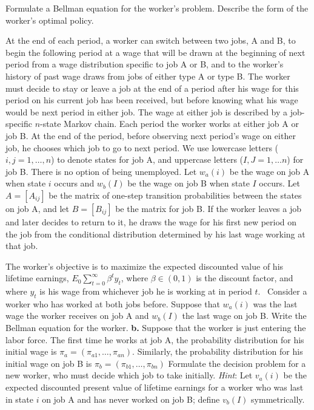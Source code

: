 \medskip
{}  Formulate a Bellman equation for
the worker's problem.
\medskip
{}  Describe the form of the worker's optimal
policy.



\medskip
{} 
\medskip
\noindent
At the end of each period,
 a worker can
switch between two jobs, A and B, to  begin the following
period at a wage that will be drawn at the beginning
of next period from a wage distribution specific to
job A or B, and to the worker's history of past wage
draws from  jobs of either type A or type B.
The worker must decide to stay or leave a job at the end
of a period after his wage for this period on his current
job has been received, but before knowing what his wage
would be next period in either job.  The wage
at either job is described by a job-specific $n$-state
Markov chain.  Each period the worker works at either job
A or job B.  At the end of the period, before observing next
period's wage on either job, he chooses which job to go to
next period.  We use lowercase letters ($i,j = 1 , \ldots, n$)
to denote states for job A, and uppercase letters
($I,J = 1, \ldots n$) for job B.
There is no option of being unemployed.
\medskip
Let $w_a(i)$ be the wage on job A when state $i$ occurs
and $w_b(I)$ be the wage on job B when state $I$ occurs.  Let
$A = \left[A_{ij}\right]$ be the matrix of one-step transition
probabilities between the states on job A, and let
$B = \left[B_{ij}\right]$ be the matrix for job B.  If the worker
leaves a job and later decides to return to it, he draws  the wage for
his first new period on the job from the conditional distribution
determined by his last wage working at that job.

  The worker's objective is to maximize the
expected discounted value of his lifetime earnings,
$E_0 \sum_{t=0}^\infty \beta^t y_t$, where $\beta \in (0,1)$
is the discount factor, and where $y_t$ is his wage from whichever
job he is working at in period $t$.
\medskip
{} \ Consider a worker who has worked
at both jobs before.  Suppose that $w_a(i)$ was the last wage the
worker receives on job A and $w_b(I)$ the last wage on job B.
Write the Bellman equation for the worker.
\medskip
\noindent
{\bf b.}  Suppose that the worker is just entering the labor
force.  The first time he works at job A, the probability distribution
for his initial wage is $\pi_a = (\pi_{a1}, \ldots, \pi_{an})$.
Similarly, the probability distribution for his initial
wage on job B is $\pi_b = (\pi_{b1}, \ldots, \pi_{bn})$  Formulate
the decision problem for a new worker, who must decide which
job to take initially.
{\it Hint}: Let $v_a(i)$ be the expected discounted present value of lifetime
earnings for a worker who was last in state $i$ on job A and
has never worked on job B; define $v_b(I)$ symmetrically.

